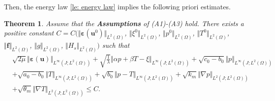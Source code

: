 \documentclass{article}
\newtheorem{theorem}{Theorem}[section]
\numberwithin{equation}{section}
\begin{document}
Then, the energy law \ref{le: energy law}  implies the following priori estimates.
\begin{theorem}\label{Th: boundness1}
Assume that the {\bf Assumptions} of (A1)-(A3) hold. 
There exists a positive constant
 $C=C(\Vert\bm\varepsilon(\bm u^0)\Vert_{L^2(\Omega)}$, $\Vert\xi^0\Vert_{L^2(\Omega)}$, $\Vert p^0\Vert_{L^2(\Omega)}$, $\Vert T^0\Vert_{L^2(\Omega)}$, $\Vert \bm f\Vert_{L^2(\Omega)}$, $
\Vert g \Vert_{L^2(\Omega)}$, $\Vert  H_{s}\Vert_{L^2(\Omega)})$
 such that
 \begin{equation}\label{estimate C}
\begin{aligned} 
 &\sqrt{2\mu}\Vert\bm\varepsilon(\bm u)\Vert_{L^\infty(J;L^2(\Omega))}
 +\sqrt{\frac{1}{\lambda}}\Vert\alpha p+\beta T-\xi\Vert_{L^\infty(J;L^2(\Omega))}+\sqrt{c_0-b_0}\Vert p\Vert_{L^\infty(J;L^2(\Omega))}\\
 &+\sqrt{a_0-b_0}\Vert T\Vert_{L^\infty(J;L^2(\Omega))} +\sqrt{b_0}\Vert p-T\Vert_{L^\infty(J;L^2(\Omega))}
 +\sqrt{k_m}\Vert \nabla p\Vert_{L^2(J;L^2(\Omega))}\\
 &+\sqrt{\theta_m}\Vert \nabla T\Vert_{L^2(J;L^2(\Omega))}
 \leq C.
 \end{aligned}
\end{equation} 
\end{theorem}
\end{document}
